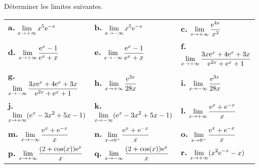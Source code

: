 \documentclass[11pt,fleqn, openany]{book} %
\begin{document}
 



\begin{exercise}[topic=lim23] Déterminer les limites suivantes.
\renewcommand{\arraystretch}{2.5}

\begin{tabularx}{\linewidth}{XXX}
 \textbf{a.} $\displaystyle \lim_{x \to +\infty} x^5\mathrm{e}^{-x}$ & \textbf{b.} $\displaystyle \lim_{x \to -\infty} x^5\mathrm{e}^{-x}$ &
 \textbf{c.} $\displaystyle \lim_{x \to +\infty} \dfrac{\mathrm{e}^{4x}}{x^2}$ \\

 \textbf{d.} $\displaystyle \lim_{x \to +\infty} \dfrac{\mathrm{e}^x-1}{\mathrm{e}^x+x}$ &  \textbf{e.} $\displaystyle \lim_{x \to -\infty} \dfrac{\mathrm{e}^x-1}{\mathrm{e}^x+x}$ &
  \textbf{f.} $\displaystyle \lim_{x \to +\infty} \dfrac{3x\mathrm{e}^x+4\mathrm{e}^x+3x}{\mathrm{e}^{2x}+\mathrm{e}^x+1}$ \\
 
 \textbf{g.}  $\displaystyle \lim_{x \to -\infty} \dfrac{3x\mathrm{e}^x+4\mathrm{e}^x+3x}{\mathrm{e}^{2x}+\mathrm{e}^x+1}$ &
 \textbf{h.} $\displaystyle \lim_{x \to +\infty} \dfrac{\mathrm{e}^{3x}}{28x}$ & \textbf{i.} $\displaystyle \lim_{x \to -\infty} \dfrac{\mathrm{e}^{3x}}{28x}$ \\
 
  \textbf{j.} $\displaystyle \lim_{x \to +\infty}(\mathrm{e}^x - 3x^2+5x-1)$ &  \textbf{k.} $\displaystyle \lim_{x \to -\infty}(\mathrm{e}^x - 3x^2+5x-1)$ &
 \textbf{l.} $\displaystyle \lim_{x \to +\infty} \dfrac{\mathrm{e}^x+\mathrm{e}^{-x}}{x}$ \\
  \textbf{m.}  $\displaystyle \lim_{x \to -\infty} \dfrac{\mathrm{e}^x+\mathrm{e}^{-x}}{x}$ &
 \textbf{n.}  $\displaystyle \lim_{x \to 0^+} \dfrac{\mathrm{e}^x+\mathrm{e}^{-x}}{x}$ &  \textbf{o.}  $\displaystyle \lim_{x \to 0^-} \dfrac{\mathrm{e}^x+\mathrm{e}^{-x}}{x}$ \\
  
 \textbf{p.}   $\displaystyle \lim_{x \to +\infty} \dfrac{(2+\cos(x))\mathrm{e}^x}{x}$ &  \textbf{q.}  $\displaystyle \lim_{x \to -\infty} \dfrac{(2+\cos(x))\mathrm{e}^x}{x}$ &
   
 \textbf{r.}    $\displaystyle \lim_{x \to +\infty}( x^2\mathrm{e}^{-x}-x)$ 
 
\end{tabularx}\end{exercise}
\end{document}
